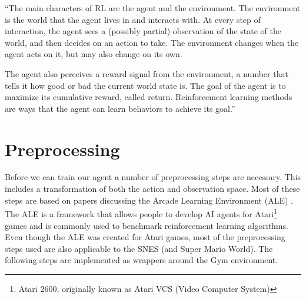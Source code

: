 \documentclass{article}
\begin{document}
``The main characters of RL are the agent and the environment.
The environment is the world that the agent lives in and interacts with.
At every step of interaction, the agent sees a (possibly partial) observation of the state of the world, and then decides on an action to take.
The environment changes when the agent acts on it, but may also change on its own.

The agent also perceives a reward signal from the environment, a number that tells it how good or bad the current world state is.
The goal of the agent is to maximize its cumulative reward, called return.
Reinforcement learning methods are ways that the agent can learn behaviors to achieve its goal.''

\section{Preprocessing}
Before we can train our agent a number of preprocessing steps are necessary.
This includes a transformation of both the action and observation space.
Most of these steps are based on papers discussing the Arcade Learning Environment (ALE) \cite{bellemare2013arcade,machado2018revisiting}.
The ALE is a framework that allows people to develop AI agents for Atari\footnote{Atari 2600, originally known as Atari VCS (Video Computer System)} games and is commonly used to benchmark reinforcement learning algorithms.
Even though the ALE was created for Atari games, most of the preprocessing steps used are also applicable to the SNES (and Super Mario World).
The following steps are implemented as wrappers around the Gym environment.
\end{document}
